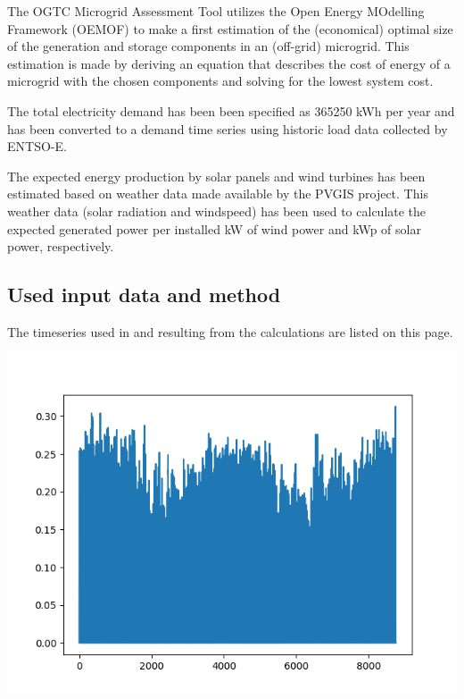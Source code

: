 \documentclass{article}[11pt]
\begin{document}
\begin{multicols}{2}
The OGTC Microgrid Assessment Tool utilizes the Open Energy MOdelling Framework (OEMOF) to make a first estimation of the (economical) optimal size of the generation and storage components in an (off-grid) microgrid. This estimation is made by deriving an equation that describes the cost of energy of a microgrid with the chosen components and solving for the lowest system cost. 

The total electricity demand has been been specified as 365250 kWh per year and has been converted to a demand time series using historic load data collected by ENTSO-E.

The expected energy production by solar panels and wind turbines has been estimated based on weather data made available by the PVGIS project. This weather data (solar radiation and windspeed) has been used to calculate the expected generated power per installed kW of wind power and kWp of solar power, respectively. \vfill\null\columnbreak\appendix

\subsection*{Used input data and method}

The timeseries used in and resulting from the calculations are listed on this page.

\begin{center}

\includegraphics[width=\linewidth]{per_unit_pv_generation.png}

\end{center}


\end{multicols}
\end{document}
